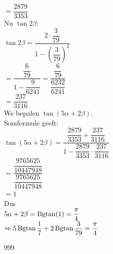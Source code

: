 \documentclass[a4paper]{article}
\begin{document}
$= \dfrac{2879}{3353}$\\

Nu $\tan 2\beta$: \\

$\tan 2\beta = \dfrac{2\cdot\dfrac{3}{79}}{1-\left(\dfrac{3}{79}\right)^2}$ \\

$= \dfrac{\dfrac{6}{79}}{1-\dfrac{9}{6241}} = \dfrac{\dfrac{6}{79}}{\dfrac{6232}{6241}}$ \\

$= \dfrac{237}{3116}$\\

We bepalen $\tan(5\alpha + 2\beta)$. \\

Somformule geeft: \\

$\tan(5\alpha + 2\beta) = \dfrac{\dfrac{2879}{3353} + \dfrac{237}{3116}}{1 - \dfrac{2879}{3353}\cdot\dfrac{237}{3116}}$ \\

$= \dfrac{\dfrac{9765625}{10447948}}{\dfrac{9765625}{10447948}}$\\

$= 1$ \\

Dus \\

$5\alpha + 2\beta = \operatorname{Bgtan}(1) = \dfrac{\pi}{4}$ \\

$\Rightarrow 5\operatorname{Bgtan}\dfrac{1}{7} + 2\operatorname{Bgtan}\dfrac{3}{79} = \dfrac{\pi}{4}$\\

\begin{thebibliography}{999}
\end{thebibliography}
\end{document}
